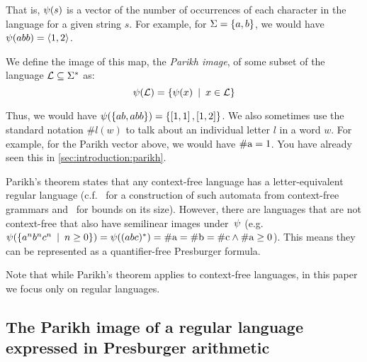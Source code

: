 \documentclass[acmsmall,review,anonymous,screen]{acmart}\settopmatter{printfolios=true,printccs=true,printacmref=true}
\theoremstyle{definition}
\begin{document}
That is, $\operatorname{\psi}(s)$ is a vector of the number of occurrences of each
character in the language for a given string $s$. For example, for  $\Sigma =
\left\{a, b\right\}$, we would have $\operatorname{\psi}(abb) = \left\langle1, 2\right\rangle$.

We define the image of this map, the \textit{Parikh image}, of some subset of
the language $\operatorname{\mathcal{L}} \subseteq \Sigma^*$ as:
\[
\operatorname{\psi}(\operatorname{\mathcal{L}}) = \left\{\operatorname{\psi}(x) \:\mid\: x \in \operatorname{\mathcal{L}}\right\}
\]

Thus, we would have $\operatorname{\psi}(\left\{ab, abb\right\}) = \left\{\left[1,
1\right], \left[1, 2\right]\right\}$. We also sometimes use the standard
notation $\#l(w)$ to talk about an individual letter $l$ in a word $w$. For
example, for the Parikh vector above, we would have $\#\text{a} = 1$. You have
already seen this in \cref{sec:introduction:parikh}.

Parikh's theorem states that any context-free language has a letter-equivalent
regular language (c.f.~\cite{construction} for a construction of such automata
from context-free grammars and~\cite{bounds} for bounds on its size). However,
there are languages that are not context-free that also have semilinear images
under~$\operatorname{\psi}$ (e.g. $\operatorname{\psi}(\left\{a^nb^nc^n \:\mid\: n \geq 0\right\}) =
\operatorname{\psi}((abc)^*) = \#\text{a} = \#\text{b} = \#\text{c} \land \#\text{a}
\geq 0$). This means they can be represented as a quantifier-free Presburger
formula.

Note that while Parikh's theorem applies to context-free languages, in this
paper we focus only on regular languages.

\subsection{The Parikh image of a regular language expressed in Presburger arithmetic}
\label{sec:verma}
\end{document}
